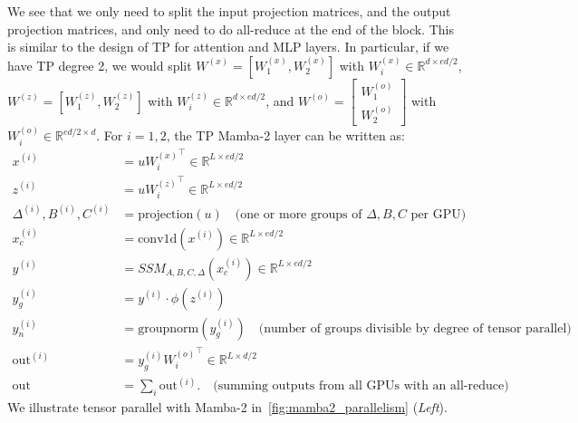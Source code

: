 We see that we only need to split the input projection matrices, and the output projection matrices, and only need to do all-reduce at the end of the block. This is similar to the design of TP for attention and MLP layers.
In particular, if we have TP degree 2, we would split $W^{(x)} = [W^{(x)}_1, W^{(x)}_2]$ with $W^{(x)}_i \in \mathbb{R}^{d \times ed/2}$,
$W^{(z)} = [W^{(z)}_1, W^{(z)}_2]$ with $W^{(z)}_i \in \mathbb{R}^{d \times ed/2}$,
and $W^{(o)} = \begin{bmatrix} W^{(o)}_1 \\ W^{(o)}_2 \end{bmatrix}$ with $W^{(o)}_i \in \mathbb{R}^{ed/2 \times d}$.
For $i = 1, 2$, the TP Mamba-2 layer can be written as:
\begin{align*}
   x^{(i)} &= u {W^{(x)}_i}^\top \in \mathbb{R}^{L \times ed / 2} \\
   z^{(i)} &= u {W^{(z)}_i}^\top \in \mathbb{R}^{L \times ed / 2} \\
   \Delta^{(i)}, B^{(i)}, C^{(i)} &= \text{projection}(u) \quad \text{(one or more groups of $\Delta, B, C$ per GPU)} \\
   x_c^{(i)} &= \mathrm{conv1d}(x^{(i)}) \in \mathbb{R}^{L \times ed / 2} \\
   y^{(i)} &= SSM_{A, B, C, \Delta}(x_c^{(i)}) \in \mathbb{R}^{L \times ed/2}  \\
   y_g^{(i)} &= y^{(i)} \cdot \phi(z^{(i)})  \\
   y_n^{(i)} &= \mathrm{groupnorm}(y_g^{(i)}) \quad \text{(number of groups divisible by degree of tensor parallel)} \\
   \mathrm{out}^{(i)} &= y_g^{(i)} {W^{(o)}_i}^\top \in \mathbb{R}^{L \times d / 2} \\
   \mathrm{out} &= \sum_i \mathrm{out}^{(i)}. \quad \text{(summing outputs from all GPUs with an all-reduce)}
\end{align*}
We illustrate tensor parallel with Mamba-2 in~\cref{fig:mamba2_parallelism} (\emph{Left}).
